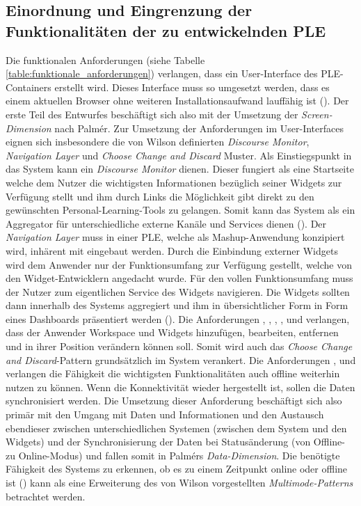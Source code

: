 \subsection{Einordnung und Eingrenzung der Funktionalitäten der zu entwickelnden PLE}
Die funktionalen Anforderungen (siehe Tabelle \ref{table:funktionale_anforderungen}) verlangen, dass ein User-Interface des PLE-Containers erstellt wird. Dieses Interface muss so umgesetzt werden, dass es einem aktuellen Browser ohne weiteren Installationsaufwand lauffähig ist (). Der erste Teil des Entwurfes beschäftigt sich also mit der Umsetzung der \emph{Screen-Dimension} nach Palmér. Zur Umsetzung der Anforderungen im User-Interfaces eignen sich insbesondere die von Wilson definierten \emph{Discourse Monitor}, \emph{Navigation Layer} und \emph{Choose Change and Discard} Muster. Als Einstiegspunkt in das System kann ein \emph{Discourse Monitor} dienen. Dieser fungiert als eine Startseite welche dem Nutzer die wichtigsten Informationen bezüglich seiner Widgets zur Verfügung stellt  und ihm durch Links die Möglichkeit gibt direkt zu den gewünschten Personal-Learning-Tools zu gelangen. Somit kann das System als ein Aggregator für unterschiedliche externe Kanäle und Services dienen (). Der \emph{Navigation Layer} muss in einer PLE, welche als Mashup-Anwendung konzipiert wird, inhärent mit eingebaut werden. Durch die Einbindung externer Widgets wird dem Anwender nur der Funktionsumfang zur Verfügung gestellt, welche von den Widget-Entwicklern angedacht wurde. Für den vollen Funktionsumfang muss der Nutzer zum eigentlichen Service des Widgets navigieren. Die Widgets sollten dann innerhalb des Systems aggregiert und ihm in übersichtlicher Form in Form eines Dashboards präsentiert werden (). Die Anforderungen , , , ,  und  verlangen, dass der Anwender Workspace und Widgets hinzufügen, bearbeiten, entfernen und in ihrer Position verändern können soll. Somit wird auch das \emph{Choose Change and Discard}-Pattern grundsätzlich im System verankert. Die Anforderungen ,  und  verlangen die Fähigkeit die wichtigsten Funktionalitäten auch offline weiterhin nutzen zu können. Wenn die Konnektivität wieder hergestellt ist, sollen die Daten synchronisiert werden. Die Umsetzung dieser Anforderung beschäftigt sich also primär mit den Umgang mit Daten und Informationen und den Austausch ebendieser zwischen unterschiedlichen Systemen (zwischen dem System und den Widgets) und der Synchronisierung der Daten bei Statusänderung (von Offline- zu Online-Modus) und fallen somit in Palmérs \emph{Data-Dimension}. Die benötigte Fähigkeit des Systems zu erkennen, ob es zu einem Zeitpunkt online oder offline ist () kann als eine Erweiterung des von Wilson vorgestellten \emph{Multimode-Patterns} betrachtet werden.   
